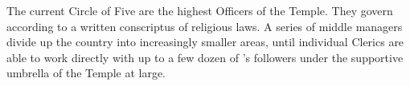 \documentclass[blue]{GL2020}
\begin{document}
The current Circle of Five are the highest Officers of the Temple. They govern according to a written conscriptus of religious laws. A series of middle managers divide up the country into increasingly smaller areas, until individual Clerics are able to work directly with up to a few dozen of \cTechGod{}'s followers under the supportive umbrella of the Temple at large.

\end{document}
